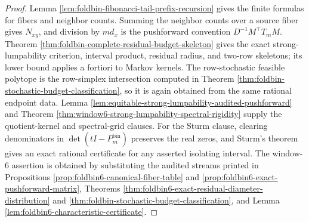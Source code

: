\begin{proof}
Lemma \ref{lem:foldbin-fibonacci-tail-prefix-recursion} gives the finite formulas for fibers and neighbor counts.  Summing the neighbor counts over a source fiber gives \(N_{xy}\), and division by \(m d_x\) is the pushforward convention \(D^{-1}M^\top T_mM\).  Theorem \ref{thm:foldbin-complete-residual-budget-skeleton} gives the exact strong-lumpability criterion, interval product, residual radius, and two-row skeletons; its lower bound applies a fortiori to Markov kernels.  The row-stochastic feasible polytope is the row-simplex intersection computed in Theorem \ref{thm:foldbin-stochastic-budget-classification}, so it is again obtained from the same rational endpoint data.  Lemma \ref{lem:equitable-strong-lumpability-audited-pushforward} and Theorem \ref{thm:window6-strong-lumpability-spectral-rigidity} supply the quotient-kernel and spectral-grid clauses.  For the Sturm clause, clearing denominators in \(\det(tI-P_m^{\mathrm{bin}})\) preserves the real zeros, and Sturm's theorem gives an exact rational certificate for any asserted isolating interval.  The window-\(6\) assertion is obtained by substituting the audited streams printed in Propositions \ref{prop:foldbin6-canonical-fiber-table} and \ref{prop:foldbin6-exact-pushforward-matrix}, Theorems \ref{thm:foldbin6-exact-residual-diameter-distribution} and \ref{thm:foldbin-stochastic-budget-classification}, and Lemma \ref{lem:foldbin6-characteristic-certificate}. \qedhere
\end{proof}

